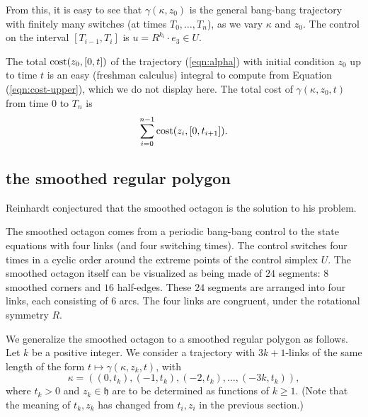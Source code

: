 \documentclass{article}
\theoremstyle{remark}
\newcommand{\op}[1]{\hbox{#1}}
\def\h{\mathfrak h}
\begin{document}
From this, it is easy to see that $\gamma(\kappa,z_0)$ is the general
bang-bang trajectory with finitely many switches (at times
$T_0,\ldots, T_n$), as we vary $\kappa$ and $z_0$. The control on the
interval $[T_{i-1},T_{i}]$ is $u=R^{k_i}\cdot e_3\in U$.

The total $\op{cost}(z_0,[0,t])$ of the trajectory (\ref{eqn:alpha})
with initial condition $z_0$ up to time $t$ is an easy (freshman
calculus) integral to compute from Equation (\ref{eqn:cost-upper}),
which we do not display here.  The total cost of
$\gamma(\kappa,z_0,t)$ from time $0$ to $T_n$ is
\begin{equation}\label{eqn:total-cost}
\sum_{i=0}^{n-1} \op{cost}(z_i,[0,t_{i+1}]).
\end{equation}



\subsection{the smoothed regular polygon}\label{sec:polygon}

Reinhardt conjectured that the smoothed octagon is the solution
to his problem.

The smoothed octagon comes from a periodic bang-bang control to the
state equations with four links (and four switching times).  The
control switches four times in a cyclic order around the extreme
points of the control simplex $U$.  The smoothed octagon itself can be
visualized as being made of $24$ segments: $8$ smoothed corners and
$16$ half-edges.  These $24$ segments are arranged into four links,
each consisting of $6$ arcs.  The four links are congruent, under the
rotational symmetry $R$.

We generalize the smoothed octagon to a smoothed regular polygon as
follows.  Let $k$ be a positive integer.  We consider a trajectory
with $3k+1$-links of the same length of the form
$t\mapsto\gamma(\kappa,z_k,t)$, with
\begin{equation}\label{eqn:3k+1}
\kappa = ((0,t_k),(-1,t_k),(-2,t_k),\ldots,(-3k,t_k)),
\end{equation}
where $t_k>0$ and $z_k\in\h$ are to be determined as functions of $k\ge1$.  
(Note that the meaning of $t_k,z_k$ has changed from $t_i,z_i$ in the previous
section.)
\end{document}
